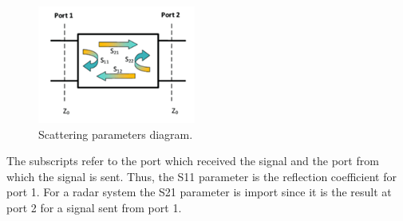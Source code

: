     \begin{figure}[H]
    \centering
    \includegraphics[width=0.4\linewidth]{Figures/chp2_Sparameters.png}
    \caption{Scattering parameters diagram.}
    \label{fig:chp2_Sparameters}
    \end{figure}

The subscripts refer to the port which received the signal and the port from which the signal is sent. Thus, the S11 parameter is the reflection coefficient for port 1. For a radar system the S21 parameter is import since it is the result at port 2 for a signal sent from port 1.




\ifstandalone

\printnoidxglossary[type=\acronymtype,nonumberlist]
\fi
%
